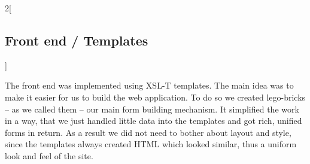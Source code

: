 \begin{multicols}{2}[\subsection{Front end / Templates}]

The front end was implemented using XSL-T templates. The main idea was to make it easier for us to build the web application. To do so we created lego-bricks -- as we called them -- our main form building mechanism. It simplified the work in a way, that we just handled little data into the templates and got rich, unified forms in return. As a result we did not need to bother about layout and style, since the templates always created HTML which looked similar, thus a uniform look and feel of the site.


\end{multicols}
